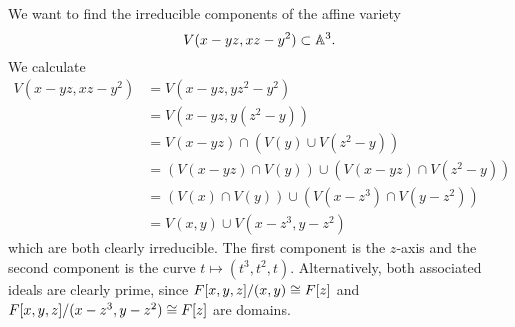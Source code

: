 \documentclass[a4paper, 12pt]{article}
\begin{document}
\begin{Exercise}
    We want to find the irreducible components of the affine variety
    \[
        V(x - yz, xz - y^2) \subset \mathbb{A}^3.
    \]
    We calculate
    \begin{align*}
        V(x - yz, xz - y^2)
        &= V(x - yz, yz^2 - y^2) \\
        &= V(x - yz, y(z^2 - y)) \\
        &= V(x - yz) \cap (V(y) \cup V(z^2 - y)) \\
        &= (V(x -yz) \cap V(y)) \cup (V(x - yz) \cap V(z^2 - y)) \\
        &= (V(x) \cap V(y)) \cup (V(x - z^3) \cap V(y - z^2)) \\
        &= V(x, y) \cup V(x - z^3, y - z^2)
    \end{align*}
    which are both clearly irreducible.
    The first component is the $z$-axis and the second component is the curve $t \mapsto (t^3, t^2, t)$.
    Alternatively, both associated ideals are clearly prime, since $F[x, y, z]/(x,y) \cong F[z]$ and $F[x, y, z]/(x-z^3,y-z^2) \cong F[z]$ are domains.
\end{Exercise}
\end{document}
